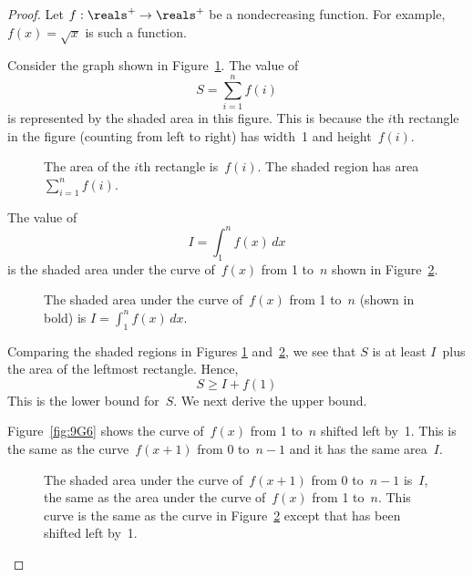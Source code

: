 \begin{proof}
Let $f: \reals^+ \to \reals^+$  be a nondecreasing function.  For
example, $f(x) = \sqrt{x}$ is such a function.

Consider the graph shown in Figure~\ref{fig:9G4}.  The value of
\begin{equation*}
    S = \sum_{i = 1}^n f(i)
\end{equation*}
is represented by the shaded area in this figure.  This is because the
$i$th rectangle in the figure (counting from left to right) has
width~1 and height~$f(i)$.

\begin{figure}


\caption{The area of the $i$th rectangle is~$f(i)$.  The shaded region
has area $\sum_{i = 1}^n f(i)$.}

\label{fig:9G4}

\end{figure}

The value of
\begin{equation*}
    I = \int_1^n f(x) \, dx
\end{equation*}
is the shaded area under the curve of~$f(x)$ from 1 to~$n$ shown in
Figure~\ref{fig:9G5}.

\begin{figure}


\caption{The shaded area under the curve of~$f(x)$ from 1 to~$n$
  (shown in bold) is $I = \int_1^n f(x)\, dx$.}

\label{fig:9G5}

\end{figure}

Comparing the shaded regions in Figures \ref{fig:9G4}
and~\ref{fig:9G5}, we see that $S$ is at least $I$~plus the area of
the leftmost rectangle.  Hence,
\begin{equation}\label{eqn:9G7}
    S \ge I + f(1)
\end{equation}
This is the lower bound for~$S$.  We next derive the upper bound.

Figure~\ref{fig:9G6} shows the curve of~$f(x)$ from 1 to~$n$ shifted
left by~1.  This is the same as the curve~$f(x + 1)$ from 0 to~$n - 1$
and it has the same area~$I$.

\begin{figure}


\caption{The shaded area under the curve of~$f(x + 1)$ from 0 to~$n -
  1$ is~$I$, the same as the area under the curve of~$f(x)$ from 1
  to~$n$.  This curve is the same as the curve in Figure~\ref{fig:9G5}
  except that has been shifted left by~1.}


\end{figure}
\end{proof}
